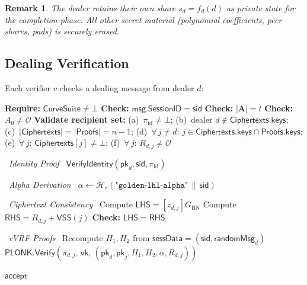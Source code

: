 \documentclass[11pt,a4paper]{article}
\newtheorem{remark}{Remark}[section]
\newcommand{\genbn}{G_{\mathrm{BN}}}
\newcommand{\pk}{\mathsf{pk}}
\newcommand{\sid}{\mathsf{sid}}
\newcommand{\hash}{\mathcal{H}}
\newcommand{\VSS}{\mathsf{VSS}}
\newcommand{\Verify}{\mathsf{Verify}}
\newcommand{\PLONK}{\mathsf{PLONK}}
\begin{document}
\begin{remark}
  The dealer retains their own share $s_d = f_d(d)$ as private state for the
  completion phase. All other secret material (polynomial coefficients, peer
  shares, pads) is securely erased.
\end{remark}

\subsection{Dealing Verification}
\label{sec:verify}

Each verifier $v$ checks a dealing message from dealer $d$:

\begin{algorithm}[H]
\caption{$\mathsf{VerifyDealing}(\mathsf{msg},\, \pk_d,\, \{\pk_j\}_{j \ne d},\, \sid,\, t)$}
\label{alg:verify}
\begin{algorithmic}[1]
\State \textbf{Require:} $\mathsf{CurveSuite} \ne \bot$ 
\State \textbf{Check:} $\mathsf{msg.SessionID} = \sid$
\State \textbf{Check:} $|\mathbf{A}| = t$
\State \textbf{Check:} $A_0 \ne \mathcal{O}$
\State \textbf{Validate recipient set:}
  (a)~$\pi_{\mathrm{id}} \ne \bot$;
  (b)~dealer $d \notin \mathsf{Ciphertexts}.\mathsf{keys}$;
  (c)~$|\mathsf{Ciphertexts}| = |\mathsf{Proofs}| = n - 1$;
  (d)~$\forall\, j \ne d$: $j \in \mathsf{Ciphertexts}.\mathsf{keys} \cap \mathsf{Proofs}.\mathsf{keys}$;
  (e)~$\forall\, j$: $\mathsf{Ciphertexts}[j] \ne \bot$;
  (f)~$\forall\, j$: $R_{d,j} \ne \mathcal{O}$

\Statex \hrulefill\ \textit{Identity Proof}\ \hrulefill
\State $\mathsf{VerifyIdentity}(\pk_d, \sid, \pi_{\mathrm{id}})$

\Statex \hrulefill\ \textit{Alpha Derivation}\ \hrulefill
\State $\alpha \leftarrow \hash_r(\texttt{"golden-lhl-alpha"} \,\|\, \sid)$

\Statex \hrulefill\ \textit{Ciphertext Consistency}\ \hrulefill
{}
  \State Compute $\mathsf{LHS} = [z_{d,j}]\genbn$
  \State Compute $\mathsf{RHS} = R_{d,j} + \VSS(j)$
    \Comment{$\VSS(j) = \sum_k [j^k] A_k$}
  \State \textbf{Check:} $\mathsf{LHS} = \mathsf{RHS}$
\EndFor

\Statex \hrulefill\ \textit{eVRF Proofs}\ \hrulefill
{}
  \State Recompute $H_1, H_2$ from $\mathsf{sessData} = (\sid, \mathsf{randomMsg}_d)$
  \State $\PLONK.\Verify(\pi_{d,j},\, \mathsf{vk},\, (\pk_d, \pk_j, H_1, H_2, \alpha, R_{d,j}))$
\EndFor

\State \Return $\mathsf{accept}$
\end{algorithmic}
\end{algorithm}
\end{document}
